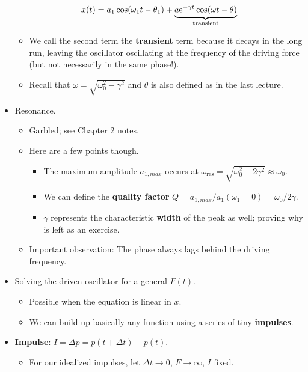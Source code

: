 \documentclass[../notes.tex]{subfiles}
\begin{document}
\begin{itemize}
    \begin{equation*}
        x(t) = a_1\cos(\omega_1t-\theta_1)+\underbrace{a\e[-\gamma t]\cos(\omega t-\theta)}_\text{transient}
    \end{equation*}
    \begin{itemize}
        \item We call the second term the \textbf{transient} term because it decays in the long run, leaving the oscillator oscillating at the frequency of the driving force (but not necessarily in the same phase!).
        \item Recall that $\omega=\sqrt{\omega_0^2-\gamma^2}$ and $\theta$ is also defined as in the last lecture.
    \end{itemize}
    \item Resonance.
    \begin{itemize}
        \item Garbled; see \textcite{bib:KibbleBerkshire} Chapter 2 notes.
        \item Here are a few points though.
        \begin{itemize}
            \item The maximum amplitude $a_{1,max}$ occurs at $\omega_\text{res}=\sqrt{\omega_0^2-2\gamma^2}\approx\omega_0$.
            \item We can define the \textbf{quality factor} $Q=a_{1,max}/a_1(\omega_1=0)=\omega_0/2\gamma$.
            \item $\gamma$ represents the characteristic \textbf{width} of the peak as well; proving why is left as an exercise.
        \end{itemize}
        \item Important observation: The phase always lags behind the driving frequency.
    \end{itemize}
    \item Solving the driven oscillator for a general $F(t)$.
    \begin{itemize}
        \item Possible when the equation is linear in $x$.
        \item We can build up basically any function using a series of tiny \textbf{impulses}.
    \end{itemize}
    \item \textbf{Impulse}: $I=\Delta p=p(t+\Delta t)-p(t)$.
    \begin{itemize}
        \item For our idealized impulses, let $\Delta t\to 0$, $F\to\infty$, $I$ fixed.

\end{itemize}
\end{itemize}
\end{document}
